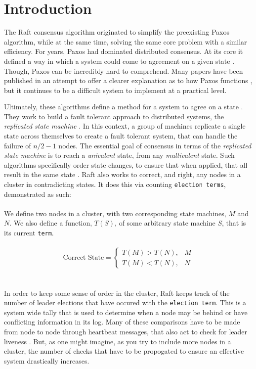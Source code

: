 \section{Introduction}

The Raft consensus algorithm originated to simplify the 
preexisting Paxos algorithm, while at the same time, 
solving the same core problem \cite{OngaroRaft} with a 
similar efficiency. For years, Paxos had dominated 
distributed consensus. At its core it defined a way in 
which a system could come to agreement on a given state 
\cite{LamportPPT}. Though, Paxos can be incredibly hard 
to comprehend. Many papers have been published in an 
attempt to offer a clearer explanation as to how Paxos 
functions \cite{LamportSimple, MazieresPractical}, but it 
continues to be a difficult system to implement at a 
practical level.

Ultimately, these algorithms define a method for a system to agree on a state \cite{BrandFSM}. They work to build a fault tolerant approach to distributed systems, the \textit{replicated state machine} \cite{SchneiderFSM}. In this context, a group of machines replicate a single state across themselves to create a fault tolerant system, that can handle the failure of $n/2 - 1$ nodes. The essential goal of consensus in terms of the \textit{replicated state machine} is to reach a \textit{univalent} state, from any \textit{multivalent} state. Such algorithms specifically order state changes, to ensure that when applied, that all result in the same state \cite{OngaroRaft, LamportTime}. Raft also works to correct, and right, any nodes in a cluster in contradicting states. It does this via counting \texttt{election terms}, demonstrated as such:
\\
\\
We define two nodes in a cluster, with two corresponding state machines, $M$ and $N$. We also define a function, $T(S)$, of some arbitrary state machine $S$, that is its current \texttt{term}.
\\
\\
$$
\text{Correct State} =
\begin{cases}
T(M) > T(N), & M\\
T(M) < T(N), & N
\end{cases}
$$
\\
\\
In order to keep some sense of order in the cluster, Raft keeps track of the number of leader elections that have occured with the \texttt{election term}. This is a system wide tally that is used to determine when a node may be behind or have conflicting information in its log.
Many of these comparisons have to be made from node to node through heartbeat messages, that also act to check for leader liveness \cite{OngaroRaft}. But, as one might imagine, as you try to include more nodes in a cluster, the number of checks that have to be propogated to ensure an effective system drastically increases.